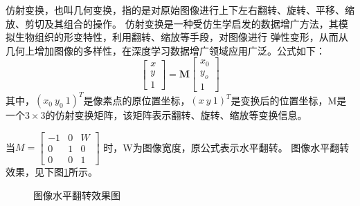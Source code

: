 仿射变换，也叫几何变换，指的是对原始图像进行上下左右翻转、旋转、平移、缩放、剪切及其组合的操作。
仿射变换是一种受仿生学启发的数据增广方法，其模拟生物组织的形变特性，利用翻转、缩放等手段，对图像进行
弹性变形，从而从几何上增加图像的多样性，在深度学习数据增广领域应用广泛。公式如下：
\begin{equation}
	\begin{bmatrix}
		x \\
		y \\
		1
	\end{bmatrix}
	=
	\bm M
	\begin{bmatrix}
		x_0 \\
		y_o \\
		1
	\end{bmatrix}
\end{equation}
其中，$(x_0\ y_0\ 1)^T$是像素点的原位置坐标，$(x\ y\ 1)^T$是变换后的位置坐标，M是一个$3\times3$的仿射变换矩阵，该矩阵表示翻转、旋转、缩放等变换信息。

当$M=\begin{bmatrix}
	-1 & 0 & W \\
	 0 & 1 & 0 \\
	 0 & 0 & 1 
\end{bmatrix}$
时，W为图像宽度，原公式表示水平翻转。
图像水平翻转效果，见下图\ref{horizon-test}所示。

\begin{figure}[H]
	\caption{图像水平翻转效果图}
	\label{horizon-test}
\end{figure}

